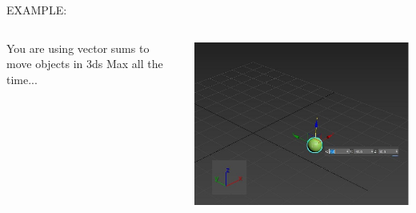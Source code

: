 \documentclass[]{beamer}
\begin{document}




\begin{frame}


  EXAMPLE:
  
  
  
  
  
  
  
  \begin{columns}
  
  You are using vector sums to move objects in 3ds Max all the time...
  
  
  
  \begin{center}
       \includegraphics[width=1.1\textwidth]{images/exampleVS1.jpg}      
       \end{center}
  
  
  \end{columns}
  
  
  
  
   \end{frame}
  
\end{document}
